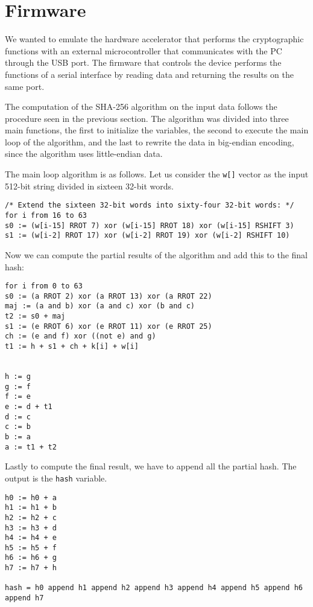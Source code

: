 \section{Firmware}
We wanted to emulate the hardware accelerator that performs the cryptographic functions with an external microcontroller that communicates with the PC through the USB port. The firmware that controls the device performs the functions of a serial interface by reading data and returning the results on the same port.

The computation of the SHA-256 algorithm on the input data follows the procedure seen in the previous section. The algorithm was divided into three main functions, the first to initialize the variables, the second to execute the main loop of the algorithm, and the last to rewrite the data in big-endian encoding, since the algorithm uses little-endian data.

\noindent The main loop algorithm is as follows.
Let us consider the \texttt{w[]} vector as the input 512-bit string divided in sixteen 32-bit words.
\begin{lstlisting}
/* Extend the sixteen 32-bit words into sixty-four 32-bit words: */
for i from 16 to 63
s0 := (w[i-15] RROT 7) xor (w[i-15] RROT 18) xor (w[i-15] RSHIFT 3)
s1 := (w[i-2] RROT 17) xor (w[i-2] RROT 19) xor (w[i-2] RSHIFT 10)

\end{lstlisting}
Now we can compute the partial results of the algorithm and add this to the final hash:
\begin{lstlisting}
for i from 0 to 63
s0 := (a RROT 2) xor (a RROT 13) xor (a RROT 22)
maj := (a and b) xor (a and c) xor (b and c)
t2 := s0 + maj
s1 := (e RROT 6) xor (e RROT 11) xor (e RROT 25)
ch := (e and f) xor ((not e) and g)
t1 := h + s1 + ch + k[i] + w[i]


h := g
g := f
f := e
e := d + t1
d := c
c := b
b := a
a := t1 + t2
\end{lstlisting}
Lastly to compute the final result, we have to append all the partial hash. The output is the \texttt{hash} variable.
\begin{lstlisting}
h0 := h0 + a
h1 := h1 + b
h2 := h2 + c
h3 := h3 + d
h4 := h4 + e
h5 := h5 + f
h6 := h6 + g
h7 := h7 + h

hash = h0 append h1 append h2 append h3 append h4 append h5 append h6 append h7

\end{lstlisting}
